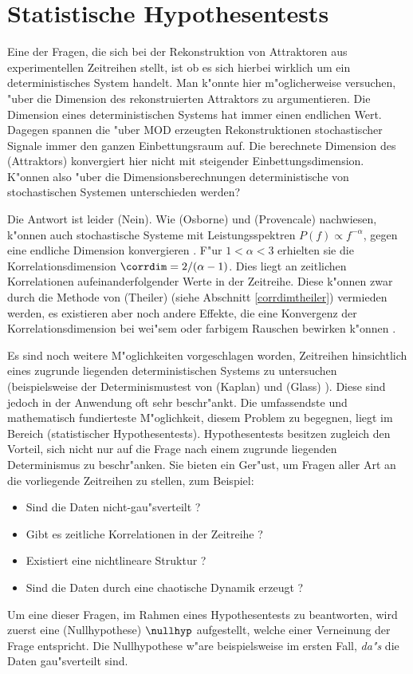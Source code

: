 
\clearpage
\section{Statistische Hypothesentests}
Eine der Fragen, die sich bei der Rekonstruktion von Attraktoren aus experimentellen
Zeitreihen stellt, ist ob es sich hierbei wirklich um ein deterministisches System
handelt.  Man k"onnte hier m"oglicherweise versuchen, "uber die Dimension des
rekonstruierten Attraktors zu argumentieren. Die Dimension eines deterministischen
Systems hat immer einen endlichen Wert. Dagegen spannen die "uber MOD erzeugten Rekonstruktionen
stochastischer Signale immer den ganzen Einbettungsraum auf. Die berechnete Dimension des \naja(Attraktors)
konvergiert hier nicht mit steigender Einbettungsdimension. K"onnen also "uber die
Dimensionsberechnungen deterministische von stochastischen Systemen unterschieden werden?

Die Antwort ist leider \naja(Nein). Wie \autor(Osborne) und \autor(Provencale)
nachwiesen, k"onnen auch stochastische Systeme mit Leistungsspektren
$P(f)\propto f^{-\alpha}$, gegen eine endliche Dimension
konvergieren \cite{Osborne89a}. F"ur $1<\alpha<3$ erhielten sie die Korrelationsdimension $\corrdim=2/(\alpha-1)$.  Dies
liegt an zeitlichen Korrelationen aufeinanderfolgender Werte in der Zeitreihe. Diese
k"onnen zwar durch die Methode von \autor(Theiler) (siehe Abschnitt \ref{corrdimtheiler})
vermieden werden, es existieren aber noch andere Effekte, die eine Konvergenz der
Korrelationsdimension bei wei"sem oder farbigem Rauschen bewirken k"onnen \cite{Kennel92b}.


Es sind noch weitere M"oglichkeiten vorgeschlagen worden, Zeitreihen hinsichtlich eines
zugrunde liegenden deterministischen Systems zu untersuchen (beispielsweise der
Determinismustest von \autor(Kaplan) und \autor(Glass) \cite{Kaplan-glass}).  Diese sind
jedoch in der Anwendung oft sehr beschr"ankt.  Die umfassendste und mathematisch
fundierteste M"oglichkeit, diesem Problem zu begegnen, liegt im Bereich \begriff(statistischer
Hypothesentests).  Hypothesentests besitzen zugleich den Vorteil, sich nicht nur auf die
Frage nach einem zugrunde liegenden Determinismus zu beschr"anken.  Sie bieten ein
Ger"ust, um Fragen aller Art an die vorliegende Zeitreihen zu stellen, zum Beispiel:
\begin{itemize}
\item Sind die Daten nicht-gau"sverteilt ?
\item Gibt es zeitliche Korrelationen in der Zeitreihe ?
\item Existiert eine nichtlineare Struktur ?
\item Sind die Daten durch eine chaotische Dynamik erzeugt ?
\end{itemize}
Um eine dieser Fragen, im Rahmen eines Hypothesentests zu beantworten, wird zuerst eine
\begriff(Nullhypothese) $\nullhyp$ aufgestellt, welche einer Verneinung der Frage
entspricht.  Die Nullhypothese w"are beispielsweise im ersten Fall, {\em da"s} die Daten
gau"sverteilt sind.  

